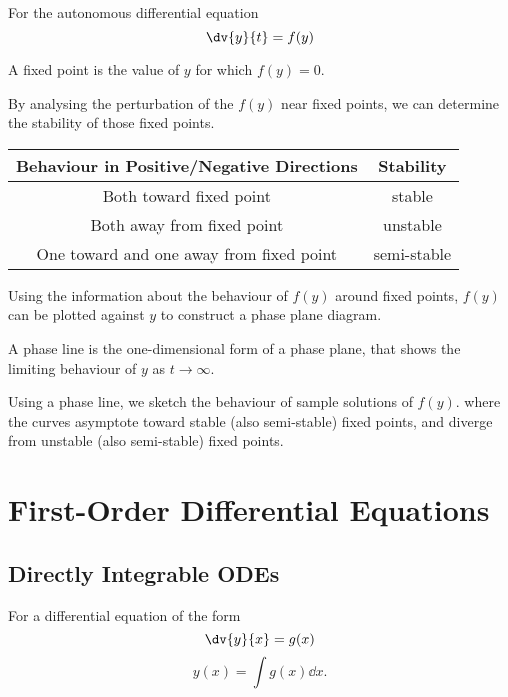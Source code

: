 \documentclass{article}
\begin{document}
For the autonomous differential equation
\begin{equation*}
    \dv{y}{t} = f(y)
\end{equation*}
\begin{definition}
    A fixed point is the value of $y$ for which $f(y) = 0$.
\end{definition}
\begin{definition}[Stability]
    By analysing the perturbation of the $f(y)$ near fixed points, we can determine the
    stability of those fixed points.
    \begin{table}[H]
        \centering
        \begin{tabular}{c | c}
            \toprule
            \textbf{Behaviour in Positive/Negative Directions} & \textbf{Stability} \\
            \midrule
            Both toward fixed point & stable \\
            Both away from fixed point & unstable \\
            One toward and one away from fixed point & semi-stable \\
            \bottomrule
        \end{tabular}
    \end{table}
\end{definition}
\begin{definition}
    Using the information about the behaviour of $f(y)$ around fixed points, $f(y)$ can be plotted against $y$
    to construct a phase plane diagram.
\end{definition}
\begin{definition}
    A phase line is the one-dimensional form of a phase plane, 
    that shows the limiting behaviour of $y$ as $t \to \infty$.
\end{definition}
\begin{definition}
    Using a phase line, we sketch the behaviour of sample solutions of $f(y)$.
    where the curves asymptote toward stable 
    (also semi-stable) fixed points, and diverge from unstable (also semi-stable) fixed points.
\end{definition}
\newpage
\section{First-Order Differential Equations}
\subsection{Directly Integrable ODEs}
For a differential equation of the form
\begin{equation*}
    \dv{y}{x} = g(x)
\end{equation*}
\begin{equation*}
    y(x) = \int g(x) \dd{x}.
\end{equation*}
\end{document}
